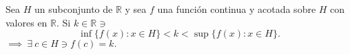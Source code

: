 \begin{tcolorbox}[colback=gray!15,colframe=gray!1!gray,title=Teorema del Valor Intermedio - Bolzano (Demostrado en clase) ]
	Sea $H$ un subconjunto de $\mathbb{R}$ y sea $f$ una función continua y acotada sobre $H$ con valores en $\mathbb{R}$. Si $k\in\mathbb{R}\ni$
	$$\inf\{f(x):x\in H\}<k<\sup\{f(x): x\in H\}.$$
	$\implies \ \exists \ c\in H \ni f(c)=k.$
\end{tcolorbox}









